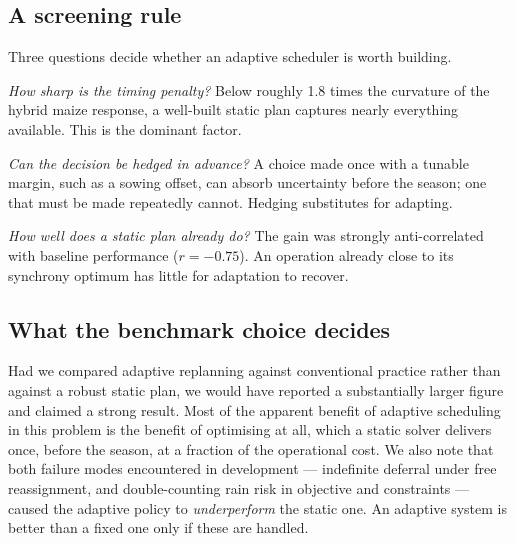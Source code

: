 \subsection{A screening rule}

Three questions decide whether an adaptive scheduler is worth building.

\emph{How sharp is the timing penalty?} Below roughly 1.8 times the
curvature of the hybrid maize response, a well-built static plan captures
nearly everything available. This is the dominant factor.

\emph{Can the decision be hedged in advance?} A choice made once with a
tunable margin, such as a sowing offset, can absorb uncertainty before the
season; one that must be made repeatedly cannot. Hedging substitutes for
adapting.

\emph{How well does a static plan already do?} The gain was strongly
anti-correlated with baseline performance ($r = -0.75$). An operation
already close to its synchrony optimum has little for adaptation to recover.

\subsection{What the benchmark choice decides}

Had we compared adaptive replanning against conventional practice rather than
against a robust static plan, we would have reported a substantially larger
figure and claimed a strong result. Most of the apparent benefit of adaptive
scheduling in this problem is the benefit of optimising at all, which a static
solver delivers once, before the season, at a fraction of the operational
cost. We also note that both failure modes encountered in development ---
indefinite deferral under free reassignment, and double-counting rain risk in
objective and constraints --- caused the adaptive policy to \emph{underperform}
the static one. An adaptive system is better than a fixed one only if these
are handled.
